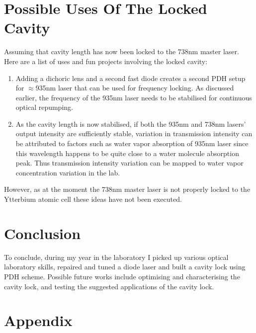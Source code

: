 \documentclass[12pt]{report}
\begin{document}
\section{Possible Uses Of The Locked Cavity}
Assuming that cavity length has now been locked to the 738nm master laser. Here are a list of uses and fun projects involving the locked cavity: 
\begin{enumerate}
    \item Adding a dichoric lens and a second fast diode creates a second PDH setup for $\approx$935nm laser that can be used for frequency locking. As discussed earlier, the frequency of the 935nm laser needs to be stabilised for continuous optical repumping.
    \item As the cavity length is now stabilised, if both the 935nm and 738nm lasers' output intensity are sufficiently stable, variation in transmission intensity can be attributed to factors such as water vapor absorption of 935nm laser since this wavelength happens to be quite close to a water molecule absorption peak. Thus transmission intensity variation can be mapped to water vapor concentration variation in the lab. 
\end{enumerate}

However, as at the moment the 738nm master laser is not properly locked to the Ytterbium atomic cell these ideas have not been executed.

\section{Conclusion}
To conclude, during my year in the laboratory I picked up various optical laboratory skills, repaired and tuned a diode laser and built a cavity lock using PDH scheme. Possible future works include optimising and characterising the cavity lock, and testing the suggested applications of the cavity lock. 

\section{Appendix}
\end{document}

